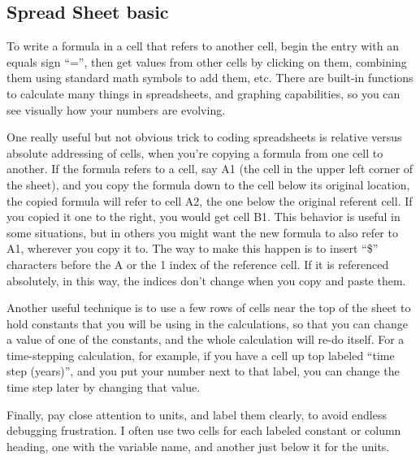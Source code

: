 \subsection{Spread Sheet basic}

To write a formula in a cell that refers to another cell, begin the entry with an equals sign “=”, then get values from other cells by clicking on them, combining them using standard math symbols to add them, etc. There are built-in functions to calculate many things in spreadsheets, and graphing capabilities, so you can see visually how your numbers are evolving.

One really useful but not obvious trick to coding spreadsheets is relative versus absolute addressing of cells, when you’re copying a formula from one cell to another. If the formula refers to a cell, say A1 (the cell in the upper left corner of the sheet), and you copy the formula down to the cell below its original location, the copied formula will refer to cell A2, the one below the original referent cell. If you copied it one to the right, you would get cell B1. This behavior is useful in some situations, but in others you might want the new formula to also refer to A1, wherever you copy it to. The way to make this happen is to insert “\$” characters before the A or the 1 index of the reference cell. If it is referenced absolutely, in this way, the indices don’t change when you copy and paste them.

Another useful technique is to use a few rows of cells near the top of the sheet to hold constants that you will be using in the calculations, so that you can change a value of one of the constants, and the whole calculation will re-do itself. For a time-stepping calculation, for example, if you have a cell up top labeled “time step (years)”, and you put your number next to that label, you can change the time step later by changing that value.

Finally, pay close attention to units, and label them clearly, to avoid endless debugging frustration. I often use two cells for each labeled constant or column heading, one with the variable name, and another just below it for the units.

